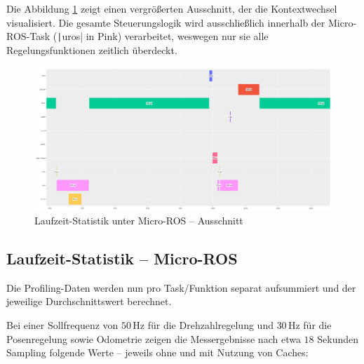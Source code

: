 Die Abbildung \ref{fig:profiling_ausschnitt} zeigt einen vergrößerten
Ausschnitt, der die Kontextwechsel visualisiert. Die gesamte Steuerungslogik
wird ausschließlich innerhalb der Micro-ROS-Task (\texttt|uros| in
Pink) verarbeitet, weswegen nur sie alle Regelungsfunktionen zeitlich überdeckt.

\begin{figure}[H]
    \centering
    \includegraphics[width=1\textwidth]{assets/micro_ros_profiling_ausschnitt_cache_enabled}
    \caption{Laufzeit-Statistik unter Micro-ROS -- Ausschnitt}
    \label{fig:profiling_ausschnitt}
\end{figure}

\subsection{Laufzeit-Statistik -- Micro-ROS}

Die Profiling-Daten werden nun pro Task/Funktion separat aufsummiert und der
jeweilige Durchschnittswert berechnet.

Bei einer Sollfrequenz von $50\,\text{Hz}$ für die Drehzahlregelung und
$30\,\text{Hz}$ für die Posenregelung sowie Odometrie zeigen die Messergebnisse
nach etwa $18$ Sekunden Sampling folgende Werte -- jeweils ohne und mit Nutzung
von Caches:

